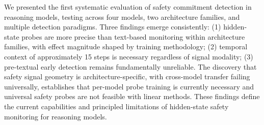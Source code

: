\documentclass[11pt,a4paper]{article}
\begin{document}
We presented the first systematic evaluation of safety commitment detection in reasoning models, testing across four models, two architecture families, and multiple detection paradigms. Three findings emerge consistently: (1) hidden-state probes are more precise than text-based monitoring within architecture families, with effect magnitude shaped by training methodology; (2) temporal context of approximately 15 steps is necessary regardless of signal modality; (3) pre-textual early detection remains fundamentally unreliable. The discovery that safety signal geometry is architecture-specific, with cross-model transfer failing universally, establishes that per-model probe training is currently necessary and universal safety probes are not feasible with linear methods. These findings define the current capabilities and principled limitations of hidden-state safety monitoring for reasoning models.


\end{document}
